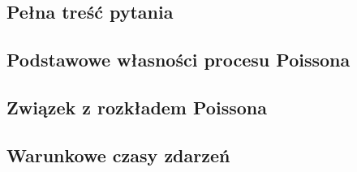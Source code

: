 {
\subsection{Pełna treść pytania}


\makeatletter
{}
\makeatother
\graphicspath{{../probabil}}

\let\realsection\section
\let\realsubsection\subsection
\let\section\subsection
\let\subsection\subsubsection
\let\subsubsection\paragraph

\realsubsection{Podstawowe własności procesu Poissona}


\realsubsection{Związek z rozkładem Poissona}


\realsubsection{Warunkowe czasy zdarzeń}


}